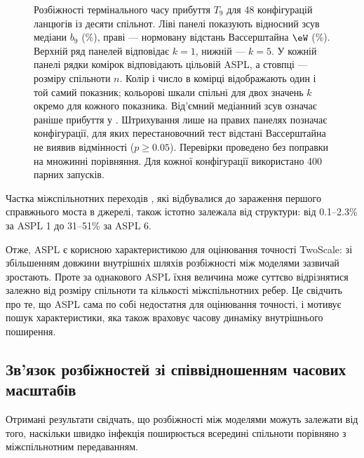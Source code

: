 \begin{figure}[tbp]
\caption{%
Розбіжності термінального часу
прибуття $T_9$ для 48 конфігурацій
ланцюгів із десяти спільнот.
Ліві панелі показують відносний зсув медіани
$b_9$ (\%), праві --- нормовану відстань
Вассерштайна $\eW$ (\%). Верхній ряд панелей
відповідає $k=1$, нижній --- $k=5$.
У кожній панелі рядки комірок відповідають
цільовій ASPL, а стовпці --- розміру спільноти $n$.
Колір і число в комірці відображають один і той самий
показник; кольорові шкали спільні для двох значень $k$
окремо для кожного показника.
Від'ємний медіанний зсув означає раніше прибуття у \TS{}.
Штрихування лише на правих панелях позначає
конфігурації, для яких перестановочний тест відстані
Вассерштайна не виявив відмінності ($p\geq0.05$).
Перевірки проведено без поправки
на множинні порівняння.
Для кожної конфігурації
використано 400 парних запусків.
}
\label{fig:accuracy_map}
\end{figure}

Частка міжспільнотних переходів
\TS{}, які відбувалися до зараження
першого справжнього моста в джерелі,
також істотно залежала від структури:
від 0.1--2.3\% за ASPL 1
до 31--51\% за ASPL 6.

Отже, ASPL є корисною характеристикою
для оцінювання точності TwoScale:
зі збільшенням довжини внутрішніх
шляхів розбіжності між моделями
зазвичай зростають. Проте за однакового
ASPL їхня величина може суттєво
відрізнятися залежно від розміру
спільноти та кількості міжспільнотних
ребер. Це свідчить про те, що ASPL
сама по собі недостатня для оцінювання
точності, і мотивує пошук характеристики,
яка також враховує часову динаміку
внутрішнього поширення.


\subsection{Зв'язок розбіжностей
зі співвідношенням часових масштабів}
\label{sec:res_descriptor}

Отримані результати свідчать,
що розбіжності між моделями
можуть залежати від того,
наскільки швидко інфекція
поширюється всередині спільноти
порівняно з міжспільнотним
передаванням.

